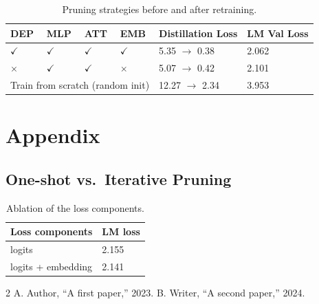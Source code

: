 \documentclass[10pt]{article}
\begin{document}
\begin{table}[h]
\centering\footnotesize
\begin{tabular}{llllll}
\toprule
DEP & MLP & ATT & EMB & Distillation Loss & LM Val Loss\\
\midrule
$\checkmark$ & $\checkmark$ & $\checkmark$ & $\checkmark$ & 5.35 $\rightarrow$ 0.38 & 2.062\\
$\times$ & $\checkmark$ & $\checkmark$ & $\times$ & 5.07 $\rightarrow$ 0.42 & 2.101\\
\multicolumn{4}{c}{Train from scratch (random init)} & 12.27 $\rightarrow$ 2.34 & 3.953\\
\bottomrule
\end{tabular}
\caption{Pruning strategies before and after retraining.}
\end{table}
\appendix
\section{Appendix}
\subsection{One-shot vs.\ Iterative Pruning}
\begin{table}[H]
\centering\footnotesize
\begin{tabular}{ll}
\toprule
Loss components & LM loss\\
\midrule
logits & 2.155\\
logits + embedding & 2.141\\
\bottomrule
\end{tabular}
\caption{Ablation of the loss components.}
\end{table}
\begin{thebibliography}{2}
 A. Author, ``A first paper,'' 2023.
 B. Writer, ``A second paper,'' 2024.
\end{thebibliography}
\end{document}
